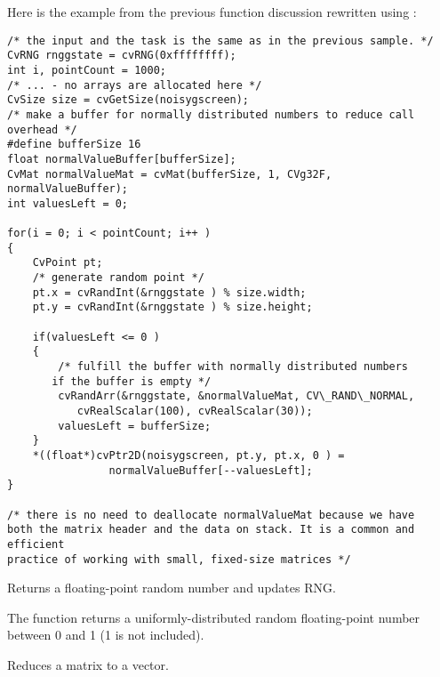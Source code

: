 \ifC
Here is the example from the previous function discussion rewritten using
:

\begin{lstlisting}
/* the input and the task is the same as in the previous sample. */
CvRNG rnggstate = cvRNG(0xffffffff);
int i, pointCount = 1000;
/* ... - no arrays are allocated here */
CvSize size = cvGetSize(noisygscreen);
/* make a buffer for normally distributed numbers to reduce call overhead */
#define bufferSize 16
float normalValueBuffer[bufferSize];
CvMat normalValueMat = cvMat(bufferSize, 1, CVg32F, normalValueBuffer);
int valuesLeft = 0;

for(i = 0; i < pointCount; i++ )
{
    CvPoint pt;
    /* generate random point */
    pt.x = cvRandInt(&rnggstate ) % size.width;
    pt.y = cvRandInt(&rnggstate ) % size.height;

    if(valuesLeft <= 0 )
    {
        /* fulfill the buffer with normally distributed numbers 
	   if the buffer is empty */
        cvRandArr(&rnggstate, &normalValueMat, CV\_RAND\_NORMAL, 
		   cvRealScalar(100), cvRealScalar(30));
        valuesLeft = bufferSize;
    }
    *((float*)cvPtr2D(noisygscreen, pt.y, pt.x, 0 ) = 
				normalValueBuffer[--valuesLeft];
}

/* there is no need to deallocate normalValueMat because we have
both the matrix header and the data on stack. It is a common and efficient
practice of working with small, fixed-size matrices */
\end{lstlisting}
\fi

Returns a floating-point random number and updates RNG.


\begin{description}
\end{description}


The function returns a uniformly-distributed random floating-point number between 0 and 1 (1 is not included).

Reduces a matrix to a vector.


